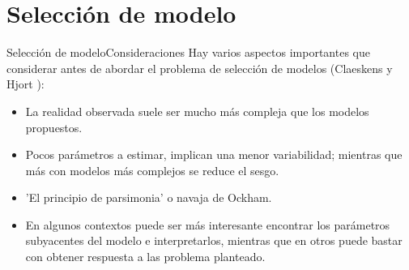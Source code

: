 
\section{Selección de modelo}




\begin{frame}{Selección de modelo}{Consideraciones}
  Hay varios aspectos importantes que considerar antes de abordar el problema de selección de modelos (Claeskens y Hjort \cite{Claeskens2010}): 

  \begin{itemize} 
    \itemsep0.8em
    \item {} La realidad observada suele ser mucho más compleja que los modelos propuestos. %

    \item {} Pocos parámetros a estimar, implican una menor variabilidad; mientras que más con modelos más complejos se reduce el sesgo.

    \item {} 'El principio de parsimonia' o navaja de Ockham.

    \item {} En algunos contextos puede ser más interesante encontrar los parámetros subyacentes del modelo e interpretarlos, mientras que en otros puede bastar con obtener respuesta a las problema planteado.
  \end{itemize}
\end{frame}

